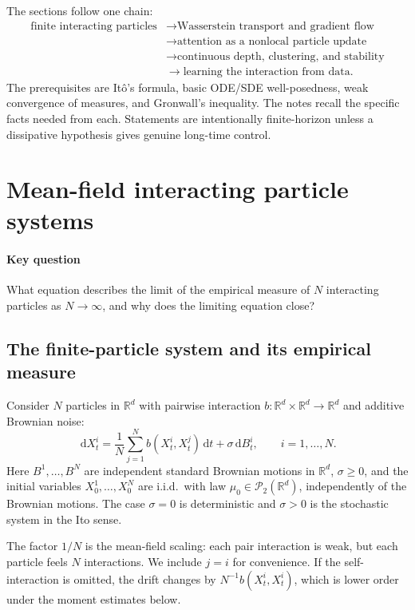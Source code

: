 \documentclass[11pt]{amsart}
\numberwithin{equation}{section}
\theoremstyle{plain}
\newcommand{\R}{\mathbb{R}}
\newcommand{\cP}{\mathcal{P}}
\newcommand{\dd}{\,\mathrm{d}}
\begin{document}
The sections follow one chain:
\[
\begin{split}
  \text{finite interacting particles}
  &\longrightarrow \text{Wasserstein transport and gradient flow}\\
  &\longrightarrow \text{attention as a nonlocal particle update}\\
  &\longrightarrow \text{continuous depth, clustering, and stability}\\
  &\longrightarrow \text{learning the interaction from data}.
\end{split}
\]
The prerequisites are It\^o's formula, basic ODE/SDE well-posedness, weak
convergence of measures, and Gronwall's inequality.  The notes recall the
specific facts needed from each.  Statements are intentionally finite-horizon
unless a dissipative hypothesis gives genuine long-time control.


\section{Mean-field interacting particle systems}\label{sec:ips}
\paragraph{\textbf{Key question}}
What equation describes the limit of the empirical measure of $N$
interacting particles as $N\to\infty$, and why does the limiting equation
close?

\subsection{The finite-particle system and its empirical measure}
Consider $N$ particles in $\R^d$ with pairwise interaction
$b:\R^d\times\R^d\to\R^d$ and additive Brownian noise:
\begin{equation}\label{eq:particles}
    \dd X_t^i=\frac1N\sum_{j=1}^N b(X_t^i,X_t^j)\dd t
       +\sigma\dd B_t^i,
    \qquad i=1,\ldots,N.
\end{equation}
Here $B^1,\ldots,B^N$ are independent standard Brownian motions in $\R^d$,
$\sigma\geq0$, and the initial variables $X_0^1,\ldots,X_0^N$ are i.i.d.\ with
law $\mu_0\in\cP_2(\R^d)$, independently of the Brownian motions.  The case
$\sigma=0$ is deterministic and $\sigma>0$ is the stochastic system in the Ito sense.

The factor $1/N$ is the mean-field scaling: each pair interaction is weak, but
each particle feels $N$ interactions.  We include $j=i$ for convenience.  If
the self-interaction is omitted, the drift changes by
$N^{-1}b(X_t^i,X_t^i)$, which is lower order under the moment estimates below.
\end{document}
